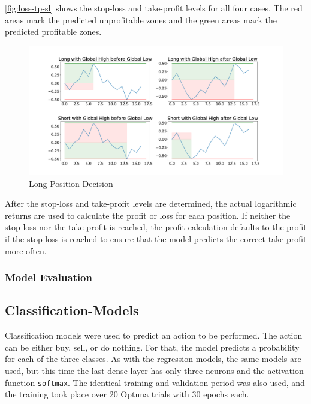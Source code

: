 \autoref{fig:loss-tp-sl} shows the stop-loss and take-profit levels for all four cases.
The red areas mark the predicted unprofitable zones and the green areas mark the predicted profitable zones.

\begin{figure}[H]
    \centering
    \includegraphics[width=\textwidth]{images/models/loss_tp_sl}
    \caption{Long Position Decision}
    \label{fig:loss-tp-sl}
\end{figure}

After the stop-loss and take-profit levels are determined, the actual logarithmic returns are used to calculate the profit or loss for each position.
If neither the stop-loss nor the take-profit is reached, the profit calculation defaults to the profit if the stop-loss is reached to ensure that the model predicts the correct take-profit more often.

\subsubsection{Model Evaluation}


\subsection{Classification-Models}
\label{chap:classification-models}

Classification models were used to predict an action to be performed.
The action can be either buy, sell, or do nothing.
For that, the model predicts a probability for each of the three classes.
As with the \hyperref[chap:regression-models]{regression models}, the same models are used, but this time the last dense layer has only three neurons and the activation function \verb|softmax|.
The identical training and validation period was also used, and the training took place over 20 Optuna trials with 30 epochs each.

